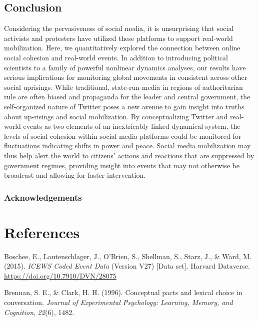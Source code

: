 \documentclass[english,man]{apa6}
\begin{document}
\hypertarget{conclusion}{%
\subsection{Conclusion}\label{conclusion}}

Considering the pervasiveness of social media, it is unsurprising
that social activists and protesters have
utilized these platforms to support real-world mobilization.
Here, we quantitatively explored the connection
between online social cohesion and real-world events. In addition
to introducing political scientists to a family of powerful nonlinear
dynamics analyses, our results have serious implications for monitoring global
movements in consistent across other social uprisings. While traditional,
state-run media in regions of authoritarian rule are often biased and
propaganda for the leader and central government, the
self-organized nature of Twitter poses a new avenue to gain insight into
truths about up-risings and social mobilization. By conceptualizing Twitter
and real-world events as two elements of an inextricably linked dynamical
system, the levels of social cohesion within social media platforms could be
monitored for fluctuations indicating shifts in power and peace. Social media
mobilization may thus help alert the world to citizens' actions and reactions
that are suppressed by government regimes, providing insight into events that
may not otherwise be broadcast and allowing for faster intervention.

\hypertarget{acknowledgements}{%
\subsubsection{Acknowledgements}\label{acknowledgements}}

\newpage

\hypertarget{references}{%
\section{References}\label{references}}

\begingroup
\setlength{\parindent}{-0.5in}
\setlength{\leftskip}{0.5in}

\hypertarget{refs}{}
\leavevmode\hypertarget{ref-DVNux2f28075_2015}{}%
Boschee, E., Lautenschlager, J., O'Brien, S., Shellman, S., Starz, J., \& Ward, M. (2015). \emph{ICEWS Coded Event Data} (Version V27) {[}Data set{]}. Harvard Dataverse. \url{https://doi.org/10.7910/DVN/28075}

\leavevmode\hypertarget{ref-brennan1996conceptual}{}%
Brennan, S. E., \& Clark, H. H. (1996). Conceptual pacts and lexical choice in conversation. \emph{Journal of Experimental Psychology: Learning, Memory, and Cognition}, \emph{22}(6), 1482.
\end{document}
